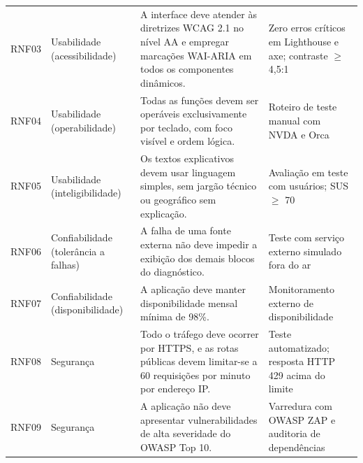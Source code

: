 \begin{longtable}{C{1.3cm}L{2.6cm}L{6.1cm}L{4.1cm}}
	RNF03       & Usabilidade (acessibilidade)         & A interface deve atender às diretrizes WCAG 2.1 no nível AA e empregar marcações WAI-ARIA em todos os componentes dinâmicos.                                                                          & Zero erros críticos em Lighthouse e axe; contraste $\geq$ 4,5:1                                \\
	RNF04       & Usabilidade (operabilidade)          & Todas as funções devem ser operáveis exclusivamente por teclado, com foco visível e ordem lógica.                                                                                                     & Roteiro de teste manual com NVDA e Orca                                                        \\
	RNF05       & Usabilidade (inteligibilidade)       & Os textos explicativos devem usar linguagem simples, sem jargão técnico ou geográfico sem explicação.                                                                                                 & Avaliação em teste com usuários; SUS $\geq$ 70                                                 \\
	RNF06       & Confiabilidade (tolerância a falhas) & A falha de uma fonte externa não deve impedir a exibição dos demais blocos do diagnóstico.                                                                                                            & Teste com serviço externo simulado fora do ar                                                  \\
	RNF07       & Confiabilidade (disponibilidade)     & A aplicação deve manter disponibilidade mensal mínima de 98\%.                                                                                                                                        & Monitoramento externo de disponibilidade                                                       \\
	RNF08       & Segurança                            & Todo o tráfego deve ocorrer por HTTPS, e as rotas públicas devem limitar-se a 60 requisições por minuto por endereço IP.                                                                              & Teste automatizado; resposta HTTP 429 acima do limite                                          \\
	RNF09       & Segurança                            & A aplicação não deve apresentar vulnerabilidades de alta severidade do OWASP Top 10.                                                                                                                  & Varredura com OWASP ZAP e auditoria de dependências                                            \\

\end{longtable}
